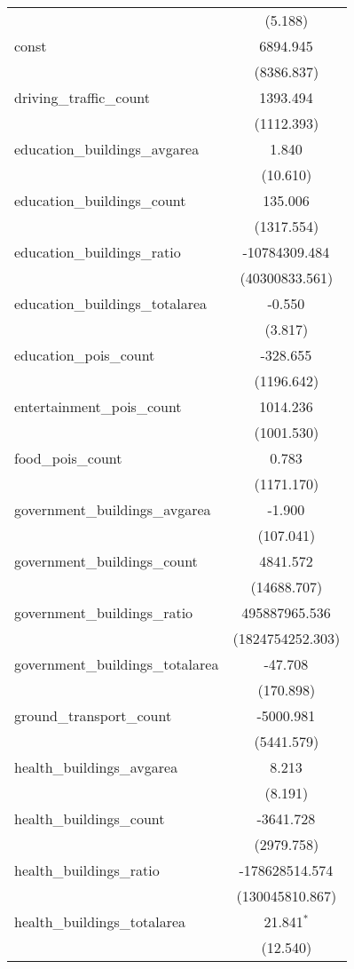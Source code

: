 \begin{table}[!htbp]
\begin{tabular}{@{\extracolsep{5pt}}lc}
  & (5.188) \\
 const & 6894.945$^{}$ \\
  & (8386.837) \\
 driving_traffic_count & 1393.494$^{}$ \\
  & (1112.393) \\
 education_buildings_avgarea & 1.840$^{}$ \\
  & (10.610) \\
 education_buildings_count & 135.006$^{}$ \\
  & (1317.554) \\
 education_buildings_ratio & -10784309.484$^{}$ \\
  & (40300833.561) \\
 education_buildings_totalarea & -0.550$^{}$ \\
  & (3.817) \\
 education_pois_count & -328.655$^{}$ \\
  & (1196.642) \\
 entertainment_pois_count & 1014.236$^{}$ \\
  & (1001.530) \\
 food_pois_count & 0.783$^{}$ \\
  & (1171.170) \\
 government_buildings_avgarea & -1.900$^{}$ \\
  & (107.041) \\
 government_buildings_count & 4841.572$^{}$ \\
  & (14688.707) \\
 government_buildings_ratio & 495887965.536$^{}$ \\
  & (1824754252.303) \\
 government_buildings_totalarea & -47.708$^{}$ \\
  & (170.898) \\
 ground_transport_count & -5000.981$^{}$ \\
  & (5441.579) \\
 health_buildings_avgarea & 8.213$^{}$ \\
  & (8.191) \\
 health_buildings_count & -3641.728$^{}$ \\
  & (2979.758) \\
 health_buildings_ratio & -178628514.574$^{}$ \\
  & (130045810.867) \\
 health_buildings_totalarea & 21.841$^{*}$ \\
  & (12.540) \\

\end{tabular}
\end{table}
